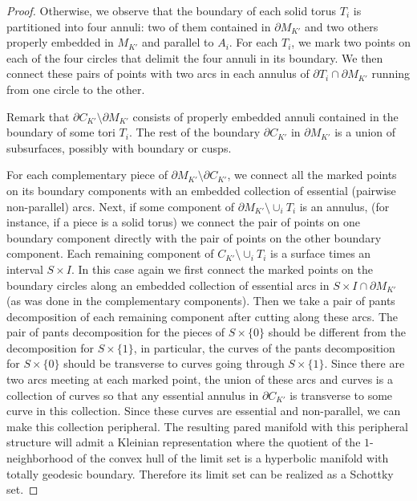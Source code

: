 \documentclass[11pt]{article}
\theoremstyle{definition}
\begin{document}
\begin{proof}
Otherwise, we observe that the boundary of each solid torus $T_i$ is partitioned into four annuli: two of them contained in $\partial M_{K'}$ and two others properly embedded in $M_{K'}$ and parallel to $A_i$. For each $T_i$, we mark two points on each of the four circles that delimit the four annuli in its boundary. We then connect these pairs of points with two arcs in  each annulus of $\partial T_i\cap \partial M_{K'}$ running from one circle to the other.

Remark that $\partial C_{K'}\setminus \partial M_{K'}$ consists of properly embedded annuli contained in the boundary of some tori $T_i$. The rest of the boundary $\partial C_{K'}$ in $\partial M_{K'}$ is a union of subsurfaces, possibly with boundary or cusps.  

For each complementary piece of $\partial M_{K'} \setminus \partial C_{K'}$, we connect all the marked points on its boundary components with an embedded collection of essential (pairwise non-parallel) arcs. Next, if some component of $\partial M_{K'}\setminus \cup_i T_i$ is an annulus, (for instance, if a piece is a solid torus) we connect the pair of points on one boundary component directly with the pair of points on the other boundary component. 
Each remaining component of $C_{K'}\setminus \cup_i T_i$ is a surface times an interval $S \times I$. In this case again we first connect the marked points on the boundary circles along an embedded collection of essential arcs in $ S \times I \cap \partial M_{K'}$ (as was done in the complementary components). Then we take a pair of pants decomposition of each remaining component after cutting along these arcs. The pair of pants decomposition for the pieces of $S \times \lbrace 0 \rbrace$ should be different from the decomposition for $S \times \lbrace 1 \rbrace$, in particular, the curves of the pants decomposition for $S \times \lbrace 0 \rbrace$ should be transverse to curves going through $S \times \lbrace 1 \rbrace$. Since there are two arcs meeting at each marked point, the union of these arcs and curves is a collection of curves so that any essential annulus in $\partial C_{K'}$ is transverse to some curve in this collection.  Since these curves are essential and non-parallel, we can make this collection peripheral.  The resulting pared manifold with this peripheral structure will admit a Kleinian representation where the quotient of the $1$-neighborhood of the convex hull of the limit set is a hyperbolic manifold with totally geodesic boundary.  Therefore its limit set can be realized as a Schottky set. 




\end{proof}
\end{document}
